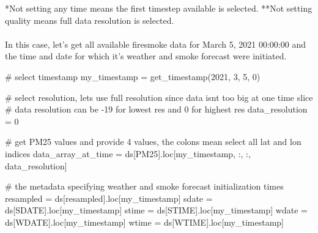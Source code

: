 \documentclass[
  letterpaper,
  DIV=11,
  numbers=noendperiod]{scrreprt}
\makeatletter
\let\oldparagraph\paragraph
\renewcommand{\paragraph}{
    \@ifstar
      \xxxParagraphStar
      \xxxParagraphNoStar
  }
\newcommand{\xxxParagraphStar}[1]{\oldparagraph*{#1}\mbox{}}
\newcommand{\xxxParagraphNoStar}[1]{\oldparagraph{#1}\mbox{}}
\newenvironment{Shaded}{\begin{snugshade}}{\end{snugshade}}
\newcommand{\CommentTok}[1]{\textcolor[rgb]{0.37,0.37,0.37}{#1}}
\newcommand{\DecValTok}[1]{\textcolor[rgb]{0.68,0.00,0.00}{#1}}
\newcommand{\NormalTok}[1]{\textcolor[rgb]{0.00,0.23,0.31}{#1}}
\newcommand{\OperatorTok}[1]{\textcolor[rgb]{0.37,0.37,0.37}{#1}}
\newcommand{\StringTok}[1]{\textcolor[rgb]{0.13,0.47,0.30}{#1}}
\makeatother
\begin{document}
*Not setting any time means the first timestep available is selected.
**Not setting quality means full data resolution is selected.

\paragraph{In this case, let's get all available firesmoke data for
March 5, 2021 00:00:00 and the time and date for which it's weather and
smoke forecast were
initiated.}\label{in-this-case-lets-get-all-available-firesmoke-data-for-march-5-2021-000000-and-the-time-and-date-for-which-its-weather-and-smoke-forecast-were-initiated.}

\begin{Shaded}
\begin{Highlighting}[]
\CommentTok{\# select timestamp}
\NormalTok{my\_timestamp }\OperatorTok{=}\NormalTok{ get\_timestamp(}\DecValTok{2021}\NormalTok{, }\DecValTok{3}\NormalTok{, }\DecValTok{5}\NormalTok{, }\DecValTok{0}\NormalTok{)}

\CommentTok{\# select resolution, let\textquotesingle{}s use full resolution since data isn\textquotesingle{}t too big at one time slice}
\CommentTok{\# data resolution can be {-}19 for lowest res and 0 for highest res}
\NormalTok{data\_resolution }\OperatorTok{=} \DecValTok{0}

\CommentTok{\# get PM25 values and provide 4 values, the colons mean select all lat and lon indices}
\NormalTok{data\_array\_at\_time }\OperatorTok{=}\NormalTok{ ds[}\StringTok{\textquotesingle{}PM25\textquotesingle{}}\NormalTok{].loc[my\_timestamp, :, :, data\_resolution]}

\CommentTok{\# the metadata specifying weather and smoke forecast initialization times}
\NormalTok{resampled }\OperatorTok{=}\NormalTok{ ds[}\StringTok{\textquotesingle{}resampled\textquotesingle{}}\NormalTok{].loc[my\_timestamp]}
\NormalTok{sdate }\OperatorTok{=}\NormalTok{ ds[}\StringTok{\textquotesingle{}SDATE\textquotesingle{}}\NormalTok{].loc[my\_timestamp]}
\NormalTok{stime }\OperatorTok{=}\NormalTok{ ds[}\StringTok{\textquotesingle{}STIME\textquotesingle{}}\NormalTok{].loc[my\_timestamp]}
\NormalTok{wdate }\OperatorTok{=}\NormalTok{ ds[}\StringTok{\textquotesingle{}WDATE\textquotesingle{}}\NormalTok{].loc[my\_timestamp]}
\NormalTok{wtime }\OperatorTok{=}\NormalTok{ ds[}\StringTok{\textquotesingle{}WTIME\textquotesingle{}}\NormalTok{].loc[my\_timestamp]}


\end{Highlighting}
\end{Shaded}
\end{document}
